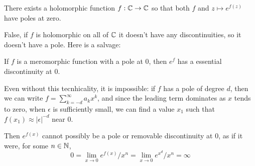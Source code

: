 \documentclass{homework}
\begin{document}
                                                                                                                                  \begin{problem}
                                                                                                                                    There exists a holomorphic function $f : \mathbb{C} \to \mathbb{C}$ so that both $f$
                                                                                                                                      and $z \mapsto e^{f(z)}$ have poles at zero.
                                                                                                                                      \end{problem}
                                                                                                                                      \begin{solution}
                                                                                                                                      False, if $f$ is holomorphic on all of $\mathbb{C}$ it doesn't have any discontinuities, so it doesn't have a pole. Here is a salvage:

                                                                                                                                      If $f$ is a meromorphic function with a pole at 0, then $e^f$ has a essential discontinuity at 0.

                                                                                                                                      Even without this tecnhicality, it is impossible: if $f$ has a pole of degree $d$, then we can write $f = \sum_{k=-d}^{\infty} a_kx^k$, and since the leading term dominates as $x$ tends to zero, when $\epsilon$ is sufficiently small, we can find a value $x_1$ such that $f(x_1)\approx |\epsilon|^{-d}$ near 0.

                                                                                                                                      Then $e^{f(x)}$ cannot possibly be a pole or removable discontinuity at 0, as if it were, for some $n\in \mathbb{N}$, 
                                                                                                                                      \[
                                                                                                                                      0 = \lim_{x\to 0} e^{f(x)}/x^n  = \lim_{x\to 0} e^{x^d}/x^n = \infty
                                                                                                                                      \]
                                                                                                                                      \end{solution}
\end{document}
